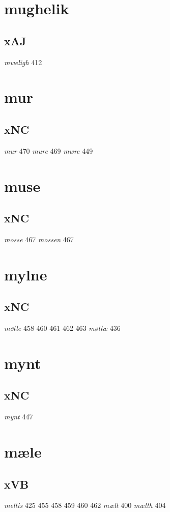 \documentclass[a4paper,twocolumn]{article}
\begin{document}
\section{mughelik}
\label{sec:org2fb9fe1}
\subsection{xAJ}
\label{sec:org3603893}
\emph{mweligh} 412 
\section{mur}
\label{sec:org485a2da}
\subsection{xNC}
\label{sec:org2fbc339}
\emph{mur} 470 \emph{mure} 469 \emph{mwre} 449 
\section{muse}
\label{sec:orgd17a121}
\subsection{xNC}
\label{sec:org1f5ffff}
\emph{mosse} 467 \emph{mossen} 467 
\section{mylne}
\label{sec:org3863aae}
\subsection{xNC}
\label{sec:orgcf84197}
\emph{mølle} 458 460 461 462 463 \emph{møllæ} 436 
\section{mynt}
\label{sec:org3aaf897}
\subsection{xNC}
\label{sec:orgf4de3f2}
\emph{mynt} 447 
\section{mæle}
\label{sec:org433c0a7}
\subsection{xVB}
\label{sec:org199d463}
\emph{meltis} 425 455 458 459 460 462 \emph{mælt} 400 \emph{mælth} 404 
\end{document}
